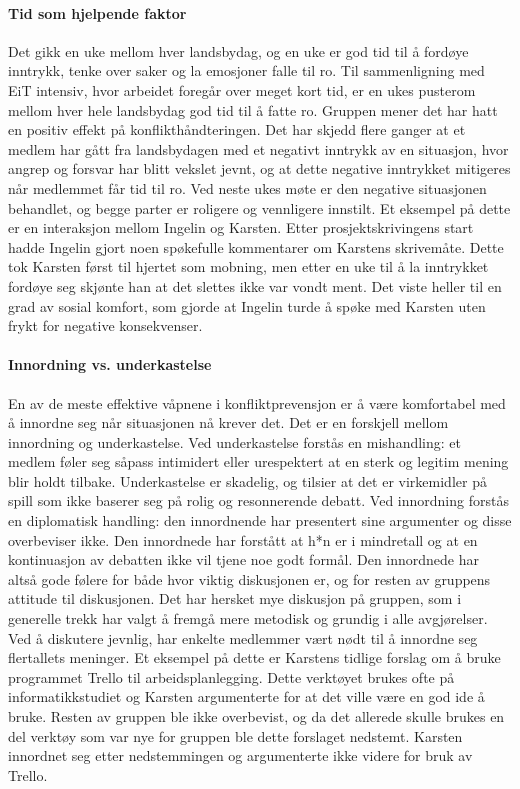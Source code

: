 \paragraph{Tid som hjelpende faktor}

Det gikk en uke mellom hver landsbydag, og en uke er god tid til å fordøye inntrykk, tenke over saker og la emosjoner falle til ro. 
Til sammenligning med EiT intensiv, hvor arbeidet foregår over meget kort tid, er en ukes pusterom mellom hver hele landsbydag god tid til å fatte ro.
Gruppen mener det har hatt en positiv effekt på konflikthåndteringen. 
Det har skjedd flere ganger at et medlem har gått fra landsbydagen med et negativt inntrykk av en situasjon, hvor angrep og forsvar har blitt vekslet jevnt, og at dette negative inntrykket mitigeres når medlemmet får tid til ro.
Ved neste ukes møte er den negative situasjonen behandlet, og begge parter er roligere og vennligere innstilt.
Et eksempel på dette er en interaksjon mellom Ingelin og Karsten.
Etter prosjektskrivingens start hadde Ingelin gjort noen spøkefulle kommentarer om Karstens skrivemåte.
Dette tok Karsten først til hjertet som mobning, men etter en uke til å la inntrykket fordøye seg skjønte han at det slettes ikke var vondt ment.
Det viste heller til en grad av sosial komfort, som gjorde at Ingelin turde å spøke med Karsten uten frykt for negative konsekvenser. 


\paragraph{Innordning vs. underkastelse}
En av de meste effektive våpnene i konfliktprevensjon er å være komfortabel med å innordne seg når situasjonen nå krever det. 
Det er en forskjell mellom innordning og underkastelse. 
Ved underkastelse forstås en mishandling: et medlem føler seg såpass intimidert eller urespektert at en sterk og legitim mening blir holdt tilbake. 
Underkastelse er skadelig, og tilsier at det er virkemidler på spill som ikke baserer seg på rolig og resonnerende debatt. Ved innordning forstås en diplomatisk handling: den innordnende har presentert sine argumenter og disse overbeviser ikke.
Den innordnede har forstått at h*n er i mindretall og at en kontinuasjon av debatten ikke vil tjene noe godt formål.
Den innordnede har altså gode følere for både hvor viktig diskusjonen er, og for resten av gruppens attitude til diskusjonen.
Det har hersket mye diskusjon på gruppen, som i generelle trekk har valgt å fremgå mere metodisk og grundig i alle avgjørelser. Ved å diskutere jevnlig, har enkelte medlemmer vært nødt til å innordne seg flertallets meninger. 
Et eksempel på dette er Karstens tidlige forslag om å bruke programmet Trello til arbeidsplanlegging. 
Dette verktøyet brukes ofte på informatikkstudiet og Karsten argumenterte for at det ville være en god ide å bruke. 
Resten av gruppen ble ikke overbevist, og da det allerede skulle brukes en del verktøy som var nye for gruppen ble dette forslaget nedstemt. 
Karsten innordnet seg etter nedstemmingen og argumenterte ikke videre for bruk av Trello. 

